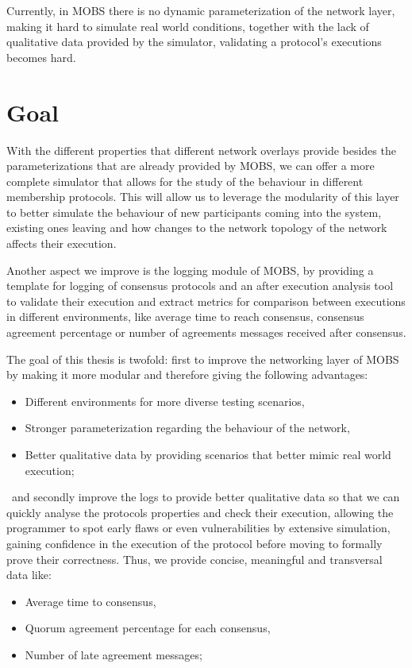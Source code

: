 Currently, in MOBS there is no dynamic parameterization of the network layer, making it hard to simulate real world conditions,
together with the lack of qualitative data provided by the simulator, validating a protocol's executions becomes hard.


\section{Goal}\label{sub:goal}

With the different properties that different network overlays provide besides the parameterizations that are already provided by MOBS,
we can offer a more complete simulator that allows for the study of the behaviour in different membership protocols.
This will allow us to leverage the modularity of this layer to better simulate the behaviour of new participants coming into the system, existing
ones leaving and how changes to the network topology of the network affects their execution.

Another aspect we improve is the logging module of MOBS, by providing a template for logging of consensus protocols and
an after execution analysis tool to validate their execution and extract metrics for
comparison between executions in different environments, like average time to reach consensus, consensus agreement percentage or
number of agreements messages received after consensus.


The goal of this thesis is twofold: first to improve the networking layer of MOBS by making it more modular and therefore giving the following advantages:
\begin{itemize}
  \item Different environments for more diverse testing scenarios,
  \item Stronger parameterization regarding the behaviour of the network,
  \item Better qualitative data by providing scenarios that better mimic real world execution;
\end{itemize}

\noindent~and secondly improve the logs to provide better qualitative data so that we can quickly analyse the
protocols properties and check their execution, allowing the programmer to spot early flaws or even vulnerabilities
by extensive simulation, gaining confidence in the execution of the protocol before moving to formally prove their correctness. 
Thus, we provide concise, meaningful and transversal data like:
\begin{itemize}
  \item Average time to consensus,
  \item Quorum agreement percentage for each consensus,
  \item Number of late agreement messages;
\end{itemize}

